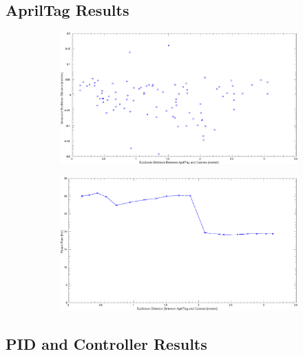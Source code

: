 \documentclass[11pt, twocolumn]{article}
\begin{document}
\subsection{AprilTag Results}
\begin{figure}
	\centering
	\begin{subfigure}[b]{\linewidth}
		\includegraphics[width=\textwidth]{images/Apr_Distance_Error.eps}
		\caption{}
		\label{fig:pid_roll}
	\end{subfigure}

	\begin{subfigure}[b]{\linewidth}
		\includegraphics[width=\textwidth]{images/Apr_FPS_vs_Dist.eps}
		\caption{}
		\label{fig:pid_roll}
	\end{subfigure}
\end{figure}



\subsection{PID and Controller Results}
\end{document}
